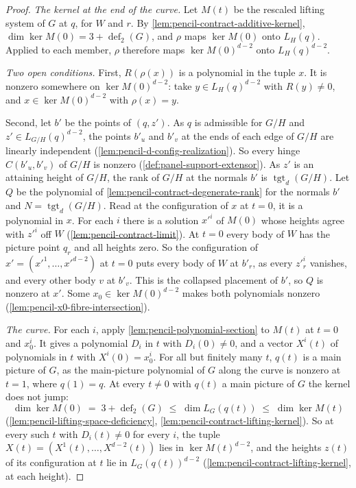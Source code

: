 \begin{proof}
  \emph{The kernel at the end of the curve.} Let $M(t)$ be the rescaled
  lifting system of $G$ at $q$, for $W$ and $r$. By
  \cref{lem:pencil-contract-additive-kernel},
  $\dim \ker M(0) = 3 + \operatorname{def}_2(G)$, and $\rho$ maps
  $\ker M(0)$ onto $L_H(q)$. Applied to each member, $\rho$ therefore maps
  $\ker M(0)^{d-2}$ onto $L_H(q)^{d-2}$.

  \emph{Two open conditions.} First, $R(\rho(x))$ is a polynomial in the
  tuple $x$. It is nonzero somewhere on $\ker M(0)^{d-2}$: take
  $y \in L_H(q)^{d-2}$ with $R(y) \neq 0$, and $x \in \ker M(0)^{d-2}$
  with $\rho(x) = y$.

  Second, let $b'$ be the points of $(q, z')$. As $q$ is admissible for
  $G/H$ and $z' \in L_{G/H}(q)^{d-2}$, the points $b'_u$ and $b'_v$ at the
  ends of each edge of $G/H$ are linearly independent
  (\cref{lem:pencil-d-config-realization}). So every hinge
  $C(b'_u, b'_v)$ of $G/H$ is nonzero (\cref{def:panel-support-extensor}).
  As $z'$ is an attaining height of $G/H$, the rank of $G/H$ at the
  normals $b'$ is $\operatorname{tgt}_d(G/H)$. Let $Q$ be the polynomial of
  \cref{lem:pencil-contract-degenerate-rank} for the normals $b'$ and
  $N = \operatorname{tgt}_d(G/H)$. Read at the configuration of $x$ at
  $t = 0$, it is a polynomial in $x$. For each $i$ there is a solution
  $x'^i$ of $M(0)$ whose heights agree with $z'^i$ off $W$
  (\cref{lem:pencil-contract-limit}). At $t = 0$ every body of $W$ has the
  picture point $q_r$ and all heights zero. So the configuration of
  $x' = (x'^1, \dots, x'^{d-2})$ at $t = 0$ puts every body of $W$ at
  $b'_r$, as every $z'^i_r$ vanishes, and every other body $v$ at $b'_v$.
  This is the collapsed placement of $b'$, so $Q$ is nonzero at $x'$. Some
  $x_0 \in \ker M(0)^{d-2}$ makes both polynomials nonzero
  (\cref{lem:pencil-x0-fibre-intersection}).

  \emph{The curve.} For each $i$, apply
  \cref{lem:pencil-polynomial-section} to $M(t)$ at $t = 0$ and $x_0^i$.
  It gives a polynomial $D_i$ in $t$ with $D_i(0) \neq 0$, and a vector
  $X^i(t)$ of polynomials in $t$ with $X^i(0) = x_0^i$. For all but
  finitely many $t$, $q(t)$ is a main picture of $G$, as the main-picture
  polynomial of $G$ along the curve is nonzero at $t = 1$, where
  $q(1) = q$. At every $t \neq 0$ with $q(t)$ a main picture of $G$ the
  kernel does not jump:
  \[
    \dim \ker M(0) \;=\; 3 + \operatorname{def}_2(G) \;\le\;
    \dim L_G(q(t)) \;\le\; \dim \ker M(t)
  \]
  (\cref{lem:pencil-lifting-space-deficiency},
  \cref{lem:pencil-contract-lifting-kernel}). So at every such $t$ with
  $D_i(t) \neq 0$ for every $i$, the tuple
  $X(t) = (X^1(t), \dots, X^{d-2}(t))$ lies in $\ker M(t)^{d-2}$, and the
  heights $z(t)$ of its configuration at $t$ lie in $L_G(q(t))^{d-2}$
  (\cref{lem:pencil-contract-lifting-kernel}, at each height).


\end{proof}
